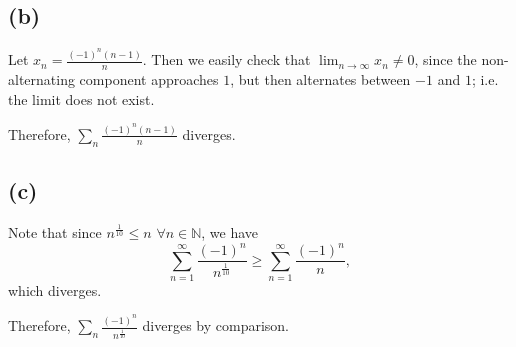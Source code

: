 \documentclass{article}
\begin{document}
\subsection*{(b)}
Let $x_n = \frac{(-1)^n(n-1)}{n}$. Then we easily check that $\lim_{n\to\infty}x_n \neq 0$, since the non-alternating component approaches $1$, but then alternates between $-1$ and $1$; i.e. the limit does not exist. 

Therefore, $\sum_n  \frac{(-1)^n(n-1)}{n}$ diverges.

\subsection*{(c)}
Note that since $n^{\frac{1}{10}} \leq n$ $\forall n \in \mathbb{N}$, we have
\begin{equation}
	\sum_{n=1}^{\infty} \frac{(-1)^n}{n^{\frac{1}{10}}} \geq \sum_{n=1}^{\infty} \frac{(-1)^n}{n},
\end{equation}
which diverges.

Therefore, $\sum_n \frac{(-1)^n}{n^{\frac{1}{10}}}$ diverges by comparison.
\end{document}
